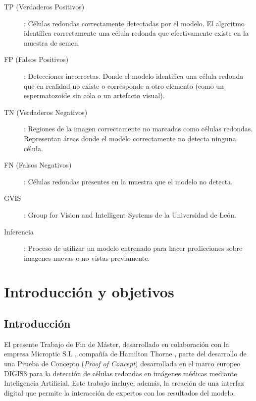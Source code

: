 \documentclass[12pt,a4paper,onecolumn,oneside]{report}
\begin{document}
\begin{description}
  \item[TP (Verdaderos Positivos)]: Células redondas correctamente detectadas por el modelo. El algoritmo identifica correctamente una célula redonda que efectivamente existe en la muestra de semen.
  \item[FP (Falsos Positivos)]: Detecciones incorrectas. Donde el modelo identifica una célula redonda que en realidad no existe o corresponde a otro elemento (como un espermatozoide sin cola o un artefacto visual).
  \item[TN (Verdaderos Negativos)]: Regiones de la imagen correctamente no marcadas como células redondas. Representan áreas donde el modelo correctamente no detecta ninguna célula.
  \item[FN (Falsos Negativos)]: Células redondas presentes en la muestra que el modelo no detecta.
  \item[GVIS]:  Group for Vision and Intelligent Systems de la Universidad de León.  
  \item[Inferencia]: Proceso de utilizar un modelo entrenado para hacer predicciones sobre imagenes nuevas o no vistas previamente.
\end{description} 

\newpage
\renewcommand{\thepage}{\arabic{page}}
\setcounter{page}{1} %

\chapter{Introducción y objetivos} %
\label{Introducción y objetivos}
\section{Introducción}
\label{sec:Introducción}

El presente Trabajo de Fin de Máster, desarrollado en colaboración con la empresa Microptic S.L \cite{microptic}, compañía de Hamilton Thorne \cite{HamiltonThorneWeb}, 
parte del desarrollo de una Prueba de Concepto (\textit{Proof of Concept}) desarrollada en el marco europeo DIGIS3 \cite{digis3} para la detección de células redondas en imágenes médicas 
mediante Inteligencia Artificial. Este trabajo incluye, además, la creación de una interfaz digital que permite la interacción de expertos 
con los resultados del modelo.
\end{document}
